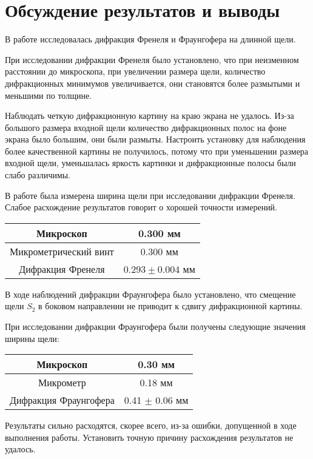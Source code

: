 \section*{Обсуждение результатов и выводы}

В работе исследовалась дифракция Френеля и Фраунгофера на 
длинной щели.

При исследовании дифракции Френеля было установлено, что при 
неизменном расстоянии до микроскопа, при увеличении размера 
щели, количество дифракционных минимумов увеличивается, 
они становятся более размытыми и меньшими по толщине.

Наблюдать четкую дифракционную картину на краю экрана не 
удалось. Из-за большого размера входной щели количество 
дифракционных полос на фоне экрана было большим, они были 
размыты. Настроить установку для наблюдения более 
качественной картины не получилось, потому что при 
уменьшении размера входной щели, уменьшалась яркость картинки 
и дифракционные полосы были слабо различимы.

В работе была измерена ширина щели при исследовании дифракции 
Френеля. Слабое расхождение результатов говорит о хорошей 
точности измерений.

\begin{tabular}{|c|c|}
\hline
Микроскоп & 0.300 мм \\
\hline
Микрометрический винт & 0.300 мм \\
\hline
Дифракция Френеля & $0.293 \pm 
0.004$ мм \\
\hline
\end{tabular}

В ходе наблюдений дифракции Фраунгофера было установлено, что 
смещение щели $S_2$ в боковом направлении не приводит к 
сдвигу дифракционной картины.

При исследовании дифракции Фраунгофера были получены 
следующие значения ширины щели:

\begin{tabular}{|c|c|}
	\hline
	Микроскоп & 0.30 мм \\
	\hline
	Микрометр & 0.18 мм \\
	\hline
	Дифракция Фраунгофера & 0.41 $\pm$ 0.06 мм \\
	\hline
\end{tabular}

Результаты сильно расходятся, скорее всего, из-за ошибки, 
допущенной в ходе выполнения работы. Установить точную 
причину расхождения результатов не удалось.